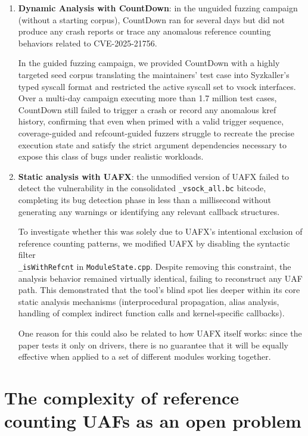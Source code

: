 \begin{enumerate}
    \item \textbf{Dynamic Analysis with CountDown}: in the unguided fuzzing campaign (without a starting corpus), CountDown ran for several days but did not produce any crash reports or trace any anomalous reference counting behaviors related to CVE-2025-21756.
    
    In the guided fuzzing campaign, we provided CountDown with a highly targeted seed corpus translating the maintainers' test case into Syzkaller's typed syscall format and restricted the active syscall set to vsock interfaces. Over a multi-day campaign executing more than 1.7 million test cases, CountDown still failed to trigger a crash or record any anomalous kref history, confirming that even when primed with a valid trigger sequence, coverage-guided and refcount-guided fuzzers struggle to recreate the precise execution state and satisfy the strict argument dependencies necessary to expose this class of bugs under realistic workloads.
    
    \item \textbf{Static analysis with UAFX}: the unmodified version of UAFX failed to detect the vulnerability in the consolidated \texttt{\_vsock\_all.bc} bitcode, completing its bug detection phase in less than a millisecond without generating any warnings or identifying any relevant callback structures.
    
    To investigate whether this was solely due to UAFX's intentional exclusion of reference counting patterns, we modified UAFX by disabling the syntactic filter\\\texttt{\_isWithRefcnt} in \texttt{ModuleState.cpp}. Despite removing this constraint, the analysis behavior remained virtually identical, failing to reconstruct any UAF path. This demonstrated that the tool's blind spot lies deeper within its core static analysis mechanisms (interprocedural propagation, alias analysis, handling of complex indirect function calls and kernel-specific callbacks).

    One reason for this could also be related to how UAFX itself works: since the paper tests it only on drivers, there is no guarantee that it will be equally effective when applied to a set of different modules working together.
\end{enumerate}

\section{The complexity of reference counting UAFs as an open problem}

